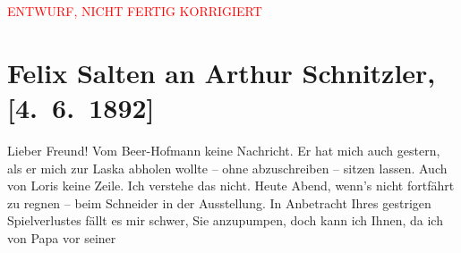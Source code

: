 
\begin{center}
            \textcolor{red}{ENTWURF, NICHT FERTIG KORRIGIERT}
                      \end{center}
            
         
         \renewcommand{\erwaehntePersonen}{Personen: Richard Beer-Hofmann, Hugo von Hofmannsthal, Julie Laska, Philipp Salzmann}
         \renewcommand{\erwaehnteInstitutionen}{Institutionen: Wiener Musik- und Theaterausstellung 1892}
         \renewcommand{\erwaehnteOrte}{Orte: Café Kremser, Café Schneider, Wien}
         \renewcommand{\erwaehnteWerke}{Werke: Muza}
               \section[Felix Salten an Arthur Schnitzler, {[}4. 6. 1892{]}]{ Felix Salten an Arthur Schnitzler, {[}4. 6. 1892{]}}\nopagebreak{}\rehead{ }\begin{ledgroupsized}[t]{13cm}\normalsize\beginnumbering \toendnotes[C]{\smallbreak\pagebreak[2]} 
\toendnotes[C]{\smallbreak}\pstart
           \noindent{}{\pb}Lieber Freund! Vom Beer-Hofmann keine Nachricht. Er hat mich auch gestern, als er mich zur Laska abholen wollte – ohne abzuschreiben –
               sitzen lassen. Auch von Loris keine Zeile. Ich
               verstehe das nicht. \pend
           \pstart
           Heute Abend, wenn’s nicht {\pb}fortfährt zu regnen – beim Schneider in der Ausstellung.\pend
           \pstart
           In Anbetracht Ihres gestrigen Spielverlustes fällt es mir schwer, Sie anzupumpen,
               doch kann ich Ihnen, da {\pb}ich von Papa vor seiner

\end{ledgroupsized}
